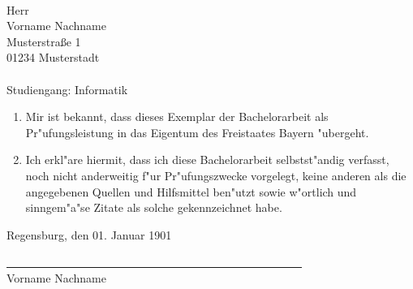 %
%
\text{ }
\vspace{7cm}
\\
Herr\\
Vorname Nachname\\
Musterstraße 1\\
01234 Musterstadt\\\\
Studiengang: Informatik\\

\begin{enumerate}
\item Mir ist bekannt, dass dieses Exemplar der Bachelorarbeit als Pr"ufungsleistung in das Eigentum des Freistaates Bayern "ubergeht.
\item Ich erkl"are hiermit, dass ich diese Bachelorarbeit selbstst"andig verfasst, noch nicht anderweitig f"ur Pr"ufungszwecke vorgelegt, keine anderen als die angegebenen Quellen und Hilfsmittel ben"utzt sowie w"ortlich und sinngem"a"se Zitate als solche gekennzeichnet habe.
\end{enumerate}
\vspace{1cm}
Regensburg, den 01. Januar 1901\\
\medskip
\medskip

\underline{~~~~~~~~~~~~~~~~~~~~~~~~~~~~~~~~~~~~~~~~~~~~~~~~~~~~}\\
Vorname Nachname\\

